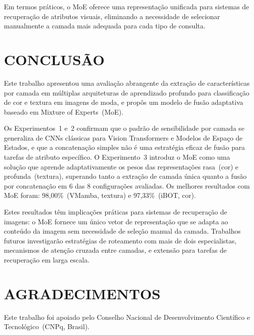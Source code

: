 \documentclass[letterpaper, 10 pt, conference]{ieeeconf}
\begin{document}
Em termos práticos, o MoE oferece uma representação unificada para sistemas
de recuperação de atributos visuais, eliminando a necessidade de selecionar
manualmente a camada mais adequada para cada tipo de consulta.

\section{CONCLUSÃO}

Este trabalho apresentou uma avaliação abrangente da extração de
características por camada em múltiplas arquiteturas de aprendizado
profundo para classificação de cor e textura em imagens de moda, e propôs
um modelo de fusão adaptativa baseado em Mixture of Experts~(MoE).

Os Experimentos~1 e~2 confirmam que o padrão de sensibilidade por camada
se generaliza de CNNs clássicas para Vision Transformers e Modelos de
Espaço de Estados, e que a concatenação simples não é uma estratégia eficaz
de fusão para tarefas de atributo específico.
O Experimento~3 introduz o MoE como uma solução que aprende adaptativamente
os pesos das representações rasa~(cor) e profunda~(textura), superando tanto
a extração de camada única quanto a fusão por concatenação em 6 das 8
configurações avaliadas.
Os melhores resultados com MoE foram: 98,00\%~(VMamba, textura) e
97,33\%~(iBOT, cor).

Estes resultados têm implicações práticas para sistemas de recuperação de
imagens: o MoE fornece um único vetor de representação que se adapta ao
conteúdo da imagem sem necessidade de seleção manual da camada.
Trabalhos futuros investigarão estratégias de roteamento com mais de dois
especialistas, mecanismos de atenção cruzada entre camadas, e extensão para
tarefas de recuperação em larga escala.

\section*{AGRADECIMENTOS}

Este trabalho foi apoiado pelo Conselho Nacional de Desenvolvimento
Científico e Tecnológico~(CNPq, Brasil).
\end{document}
